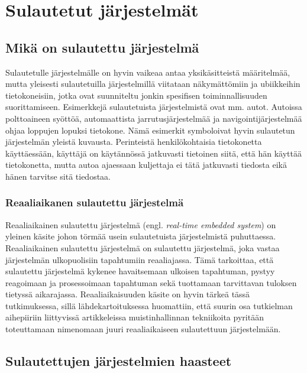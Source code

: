 \chapter{Sulautetut järjestelmät} \label{Kolmas luku}

\section{Mikä on sulautettu järjestelmä}

Sulautetulle järjestelmälle on hyvin vaikeaa antaa yksikäsitteistä määritelmää, mutta yleisesti sulautetuilla järjestelmillä viitataan näkymättömiin ja ubiikkeihin tietokoneisiin, jotka ovat suunniteltu jonkin spesifisen toiminnallisuuden suorittamiseen. Esimerkkejä sulautetuista järjestelmistä ovat mm. autot. Autoissa polttoaineen syöttöä, automaattista jarrutusjärjestelmää ja navigointijärjestelmää ohjaa loppujen lopuksi tietokone.\cite{rtcfes2015book} Nämä esimerkit symboloivat hyvin sulautetun järjestelmän yleistä kuvausta. Perinteistä henkilökohtaisia tietokonetta käyttäessään, käyttäjä on käytännössä jatkuvasti tietoinen siitä, että hän käyttää tietokonetta, mutta autoa ajaessaan kuljettaja ei tätä jatkuvasti tiedosta eikä hänen tarvitse sitä tiedostaa.

\subsection{Reaaliaikanen sulautettu järjestelmä}

Reaaliaikainen sulautettu järjestelmä (engl. \textit{real-time embedded system}) on yleinen käsite johon törmää usein sulautetuista järjestelmistä puhuttaessa. Reaaliaikainen sulautettu järjestelmä on sulautettu järjestelmä, joka vastaa järjestelmän ulkopuolisiin tapahtumiin reaaliajassa. Tämä tarkoittaa, että sulautettu järjestelmä kykenee havaitsemaan ulkoisen tapahtuman, pystyy reagoimaan ja prosessoimaan tapahtuman sekä tuottamaan tarvittavan tuloksen tietyssä aikarajassa.\cite{rtcfes2015book} Reaaliaikaisuuden käsite on hyvin tärkeä tässä tutkimuksessa, sillä lähdekartoituksessa huomattiin, että suurin osa tutkielman aihepiiriin liittyvissä artikkeleissa muistinhallinnan tekniikoita pyritään toteuttamaan nimenomaan juuri reaaliaikaiseen sulautettuun järjestelmään.

\section{Sulautettujen järjestelmien haasteet} 

